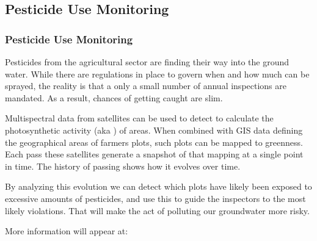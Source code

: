 \subsection{Pesticide Use Monitoring}
\begin{frame}
  \frametitle{Pesticide Use Monitoring}
  Pesticides from the agricultural sector are finding their way into the ground water. While there are regulations in place to govern when and how much can be sprayed, the reality is that a only a small number of annual inspections are mandated. As a result, chances of getting caught are slim.
  \vspace{2mm}
  
  Multispectral data from satellites can be used to detect to calculate the photosynthetic activity (aka ) of areas. When combined with GIS data defining the geographical areas of farmers plots, such plots can be mapped to greenness. Each pass these satellites generate a snapshot of that mapping at a single point in time. The history of passing shows how it evolves over time.
  \vspace{2mm}
  
  By analyzing this evolution we can detect which plots have likely been exposed to excessive amounts of pesticides, and use this to guide the inspectors to the most likely violations. That will make the act of polluting our groundwater more risky.
  \vspace{2mm}
  
  More information will appear at: 
\end{frame}

